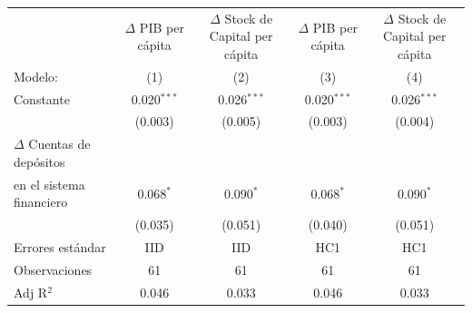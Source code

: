 \begingroup
\centering
\begin{tabular}{lcccc}
   \tabularnewline \midrule \midrule
                                             & $\Delta$ PIB per cápita  & \makecell{$\Delta$ Stock de Capital \\per cápita}     & $\Delta$ PIB per cápita  & \makecell{$\Delta$ Stock de Capital \\per cápita}\\      
   Modelo:                                                       & (1)                      & (2)                                                   & (3)                      & (4)\\  
   \midrule
 
   Constante                                                     & 0.020$^{***}$            & 0.026$^{***}$                                         & 0.020$^{***}$            & 0.026$^{***}$\\   
                                                                & (0.003)                  & (0.005)                                               & (0.003)                  & (0.004)\\   
   $\Delta$ Cuentas de depósitos \\ en el sistema financiero    & 0.068$^{*}$              & 0.090$^{*}$                                           & 0.068$^{*}$              & 0.090$^{*}$\\   
                                                                & (0.035)                  & (0.051)                                               & (0.040)                  & (0.051)\\   
   \midrule
Errores estándar & IID & IID & HC1 & HC1 \\
   Observaciones                                                 & 61                       & 61                                                    & 61                       & 61\\  
   Adj R$^2$                                               & 0.046                    & 0.033                                                 & 0.046                    & 0.033\\  
   \midrule \midrule
\end{tabular}
\par\endgroup
